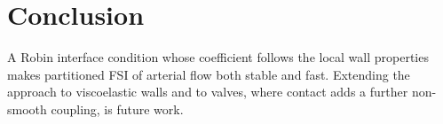\chapter{Conclusion}
\label{ch:conclusion}

A Robin interface condition whose coefficient follows the local wall properties makes
partitioned FSI of arterial flow both stable and fast. Extending the approach to
viscoelastic walls and to valves, where contact adds a further non-smooth coupling, is future
work.
